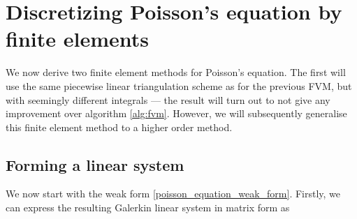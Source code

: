 % 
% 

\section{Discretizing Poisson's equation by finite elements}
We now derive two finite element methods for Poisson's equation. The first will use
the same piecewise linear triangulation scheme as for the previous FVM, but with seemingly different integrals --- the
result will turn out to not give any improvement over algorithm \ref{alg:fvm}. However, we will subsequently generalise this finite element method
to a higher order method.

\subsection{Forming a linear system}
We now start with the weak form \eqref{poisson_equation_weak_form}.
Firstly, we can express the resulting Galerkin linear system in matrix form as


